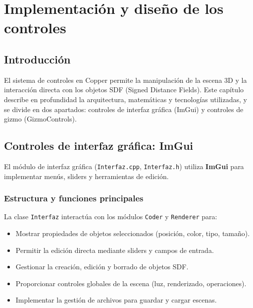 \chapter{Implementación y diseño de los controles}

\section{Introducción}

El sistema de controles en Copper permite la manipulación de la escena 3D y la
interacción directa con los objetos SDF (Signed Distance Fields). Este capítulo
describe en profundidad la arquitectura, matemáticas y tecnologías utilizadas,
y se divide en dos apartados: controles de interfaz gráfica (ImGui) y controles
de gizmo (GizmoControls).

\section{Controles de interfaz gráfica: ImGui}

El módulo de interfaz gráfica (\texttt{Interfaz.cpp}, \texttt{Interfaz.h})
utiliza \textbf{ImGui} para implementar menús, sliders y herramientas de
edición.

\subsection{Estructura y funciones principales}

La clase \texttt{Interfaz} interactúa con los módulos \texttt{Coder} y
\texttt{Renderer} para:
\begin{itemize}
    \item Mostrar propiedades de objetos seleccionados (posición, color, tipo, tamaño).
    \item Permitir la edición directa mediante sliders y campos de entrada.
    \item Gestionar la creación, edición y borrado de objetos SDF.
    \item Proporcionar controles globales de la escena (luz, renderizado, operaciones).
    \item Implementar la gestión de archivos para guardar y cargar escenas.
\end{itemize}

